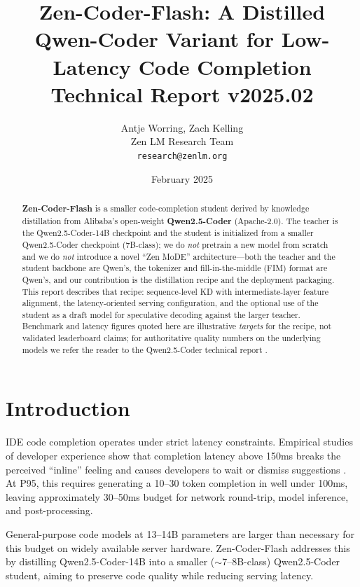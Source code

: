 \documentclass[11pt,a4paper]{article}
\title{\textbf{Zen-Coder-Flash: A Distilled Qwen-Coder Variant for Low-Latency Code Completion}\\
\large Technical Report v2025.02}
\author{Antje Worring, Zach Kelling \\ Zen LM Research Team\\
\texttt{research@zenlm.org}}
\date{February 2025}
\begin{document}
\maketitle

\begin{abstract}
\textbf{Zen-Coder-Flash} is a smaller code-completion student derived by knowledge distillation
from Alibaba's open-weight \textbf{Qwen2.5-Coder} \cite{qwen25coder} (Apache-2.0). The teacher is the
Qwen2.5-Coder-14B checkpoint and the student is initialized from a smaller Qwen2.5-Coder checkpoint
(7B-class); we do \emph{not} pretrain a new model from scratch and we do \emph{not} introduce a novel
``Zen MoDE'' architecture---both the teacher and the student backbone are Qwen's, the tokenizer and
fill-in-the-middle (FIM) format are Qwen's, and our contribution is the distillation recipe and the
deployment packaging. This report describes that recipe: sequence-level KD with intermediate-layer
feature alignment, the latency-oriented serving configuration, and the optional use of the student as
a draft model for speculative decoding against the larger teacher. Benchmark and latency figures
quoted here are illustrative \emph{targets} for the recipe, not validated leaderboard claims; for
authoritative quality numbers on the underlying models we refer the reader to the Qwen2.5-Coder
technical report \cite{qwen25coder}.
\end{abstract}

\tableofcontents
\newpage

\section{Introduction}

IDE code completion operates under strict latency constraints. Empirical studies of developer
experience show that completion latency above 150ms breaks the perceived ``inline'' feeling and
causes developers to wait or dismiss suggestions \cite{svyatkovskiy2021fast}. At P95, this
requires generating a 10--30 token completion in well under 100ms, leaving approximately 30--50ms
budget for network round-trip, model inference, and post-processing.

General-purpose code models at 13--14B parameters are larger than necessary for this budget on widely
available server hardware. Zen-Coder-Flash addresses this by distilling Qwen2.5-Coder-14B
\cite{qwen25coder} into a smaller ($\sim$7--8B-class) Qwen2.5-Coder student, aiming to preserve code
quality while reducing serving latency.
\end{document}
